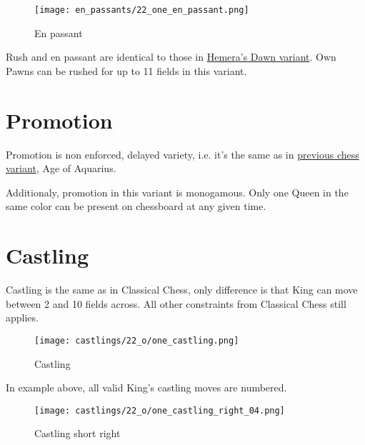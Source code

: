 \vspace*{-1.2\baselineskip}
\noindent
\begin{figure}[!h]
\texttt{[image: en\_passants/22\_one\_en\_passant.png]}
\caption{En passant}
\label{fig:22_one_en_passant}
\end{figure}

Rush and en passant are identical to those in
\hyperref[fig:14_hemera_s_dawn_en_passant]{Hemera's Dawn variant}.
Own Pawns can be rushed for up to 11 fields in this variant.

\clearpage %

\section*{Promotion}
\label{sec:One/Promotion}

Promotion is non enforced, delayed variety, i.e. it's the same as in
\hyperref[sec:Age of Aquarius/Promotion]{previous chess variant}, Age of Aquarius.

Additionaly, promotion in this variant is monogamous.
Only one Queen in the same color can be present on chessboard at any given time.


\section*{Castling}

Castling is the same as in Classical Chess, only difference is that King can move
between 2 and 10 fields across. All other constraints from Classical Chess still
applies.

\noindent
\begin{figure}[!h]
\texttt{[image: castlings/22\_o/one\_castling.png]}
\caption{Castling}
\label{fig:one_castling}
\end{figure}

In example above, all valid King's castling moves are numbered.

\noindent
\begin{figure}[!h]
\texttt{[image: castlings/22\_o/one\_castling\_right\_04.png]}
\caption{Castling short right}
\label{fig:one_castling_right_04}
\end{figure}

